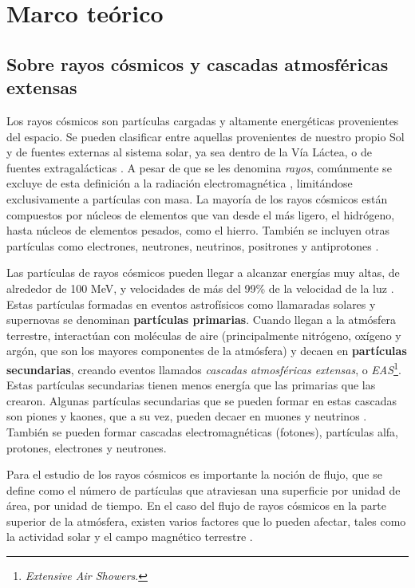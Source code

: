 \documentclass[12pt]{report}
\begin{document}
\section*{Marco teórico}

\subsection*{Sobre rayos cósmicos y cascadas atmosféricas extensas}

\normalsize

Los rayos cósmicos son partículas cargadas y altamente energéticas provenientes del espacio. Se pueden clasificar entre aquellas provenientes de nuestro propio Sol y de fuentes externas al sistema solar, ya sea dentro de la Vía Láctea, o de fuentes extragalácticas \cite{moldwin2008introduction}. A pesar de que se les denomina \textit{rayos}, comúnmente se excluye de esta definición a la radiación electromagnética \cite{NASACosmicopia}, limitándose exclusivamente a partículas con masa. La mayoría de los rayos cósmicos están compuestos por núcleos de elementos que van desde el más ligero, el hidrógeno, hasta núcleos de elementos pesados, como el hierro. También se incluyen otras partículas como electrones, neutrones, neutrinos, positrones y antiprotones \cite{NASAImagine}.

Las partículas de rayos cósmicos pueden llegar a alcanzar energías muy altas, de alrededor de 100 MeV, y velocidades de más del 99\% de la velocidad de la luz \cite{moldwin2008introduction}. Estas partículas formadas en eventos astrofísicos como llamaradas solares y supernovas se denominan \textbf{partículas primarias}. Cuando llegan a la atmósfera terrestre, interactúan con moléculas de aire (principalmente nitrógeno, oxígeno y argón, que son los mayores componentes de la atmósfera) y decaen en \textbf{partículas secundarias}, creando eventos llamados \textit{cascadas atmosféricas extensas}, o \textit{EAS}\footnote{\textit{Extensive Air Showers}.}. Estas partículas secundarias tienen menos energía que las primarias que las crearon. Algunas partículas secundarias que se pueden formar en estas cascadas son piones y kaones, que a su vez, pueden decaer en muones y neutrinos \cite{grieder2010extensive}. También se pueden formar cascadas electromagnéticas (fotones), partículas alfa, protones, electrones y neutrones.

Para el estudio de los rayos cósmicos es importante la noción de flujo, que se define como el número de partículas que atraviesan una superficie por unidad de área, por unidad de tiempo. En el caso del flujo de rayos cósmicos en la parte superior de la atmósfera, existen varios factores que lo pueden afectar, tales como la actividad solar y el campo magnético terrestre \cite{PhysRevD.98.030001}.
\end{document}
